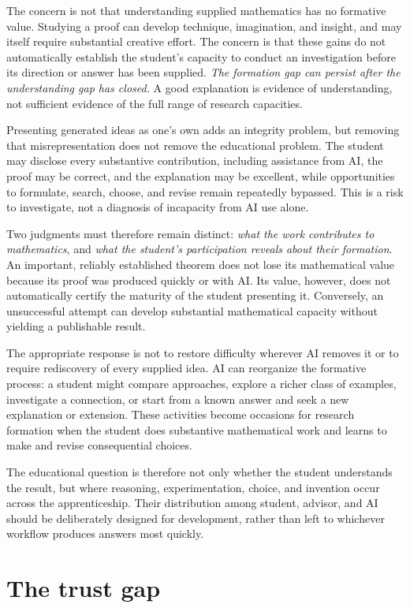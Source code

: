 \documentclass[11pt]{article}
\begin{document}
The concern is not that understanding supplied mathematics has no formative value.
Studying a proof can develop technique, imagination, and insight, and may itself require
substantial creative effort. The concern is that these gains do not automatically
establish the student's capacity to conduct an investigation before its direction or
answer has been supplied. \emph{The formation gap can persist after the understanding
gap has closed.} A good explanation is evidence of understanding, not sufficient evidence
of the full range of research capacities.

Presenting generated ideas as one's own adds an integrity problem, but removing that
misrepresentation does not remove the educational problem. The student may disclose
every substantive contribution, including assistance from AI, the proof may be correct,
and the explanation may be
excellent, while opportunities to formulate, search, choose, and revise remain repeatedly
bypassed. This is a risk to investigate, not a diagnosis of incapacity from AI use alone.

Two judgments must therefore remain distinct: \emph{what the work contributes to
mathematics}, and \emph{what the student's participation reveals about their formation}.
An important, reliably established theorem does not lose its mathematical value because
its proof was produced quickly or with AI. Its value, however, does not automatically
certify the maturity of the student presenting it. Conversely, an unsuccessful attempt
can develop substantial mathematical capacity without yielding a publishable result.

The appropriate response is not to restore difficulty wherever AI removes it or to
require rediscovery of every supplied idea. AI can reorganize the formative process:
a student might compare approaches, explore a richer class of examples, investigate a
connection, or start from a known answer and seek a new explanation or extension.
These activities become occasions for research formation when the student does
substantive mathematical work and learns to make and revise consequential choices.

The educational question is therefore not only whether the student understands the
result, but where reasoning, experimentation, choice, and invention occur across the
apprenticeship. Their distribution among student, advisor, and AI should be deliberately
designed for development, rather than left to whichever workflow produces answers most
quickly.

\section{The trust gap}
\end{document}

